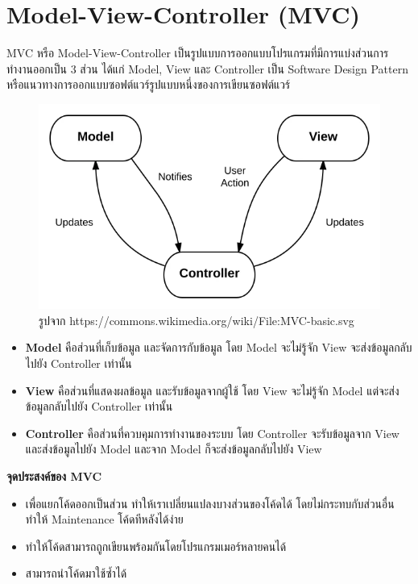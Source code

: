 \section{Model-View-Controller (MVC)}
\hspace{1.27cm}MVC หรือ Model-View-Controller\cite{mvc} เป็นรูปแบบการออกแบบโปรแกรมที่มีการแบ่งส่วนการทำงานออกเป็น 3 ส่วน ได้แก่ Model, View และ Controller เป็น Software Design Pattern หรือแนวทางการออกแบบซอฟต์แวร์รูปแบบหนึ่งของการเขียนซอฟต์แวร์

\begin{figure}[H]
  \centering
  \includegraphics[width=\linewidth, keepaspectratio]{pictures/mvc.png}
  \caption[Model View Controller]{รูปจาก https://commons.wikimedia.org/wiki/File:MVC-basic.svg}
  \label{fig:mvc}
  
\end{figure}
\begin{itemize}
  \item \textbf{Model} คือส่วนที่เก็บข้อมูล และจัดการกับข้อมูล โดย Model จะไม่รู้จัก View จะส่งข้อมูลกลับไปยัง Controller เท่านั้น
  \item \textbf{View} คือส่วนที่แสดงผลข้อมูล และรับข้อมูลจากผู้ใช้ โดย View จะไม่รู้จัก Model แต่จะส่งข้อมูลกลับไปยัง Controller เท่านั้น
  \item \textbf{Controller} คือส่วนที่ควบคุมการทำงานของระบบ โดย Controller จะรับข้อมูลจาก View และส่งข้อมูลไปยัง Model และจาก Model ก็จะส่งข้อมูลกลับไปยัง View
\end{itemize}
\textbf{จุดประสงค์ของ MVC}
\begin{itemize}
  \item เพื่อแยกโค้ดออกเป็นส่วน ทำให้เราเปลี่ยนแปลงบางส่วนของโค้ดได้ โดยไม่กระทบกับส่วนอื่น ทำให้ Maintenance โค้ดทีหลังได้ง่าย
  \item ทำให้โค้ดสามารถถูกเขียนพร้อมกันโดยโปรแกรมเมอร์หลายคนได้
  \item สามารถนำโค้ดมาใช้ซ้ำได้
\end{itemize}

